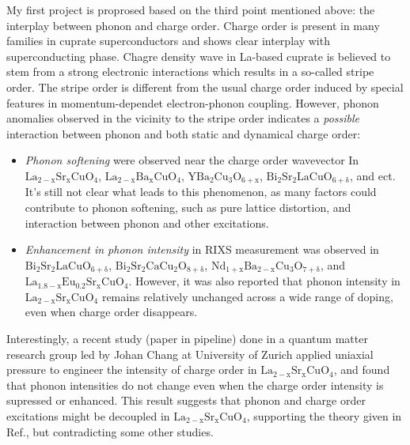 \documentclass[11pt]{article}
\begin{document}
My first project is proprosed based on the third point mentioned above: the interplay between phonon and charge order. Charge order is present in many families in cuprate superconductors and shows clear interplay with superconducting phase. Chagre density wave in La-based cuprate is believed to stem from a strong electronic interactions which results in a so-called stripe order\cite{harriger_stripe_nodate,tranquada_evidence_1995,choi_disentangling_2020}. The stripe order is different from the usual charge order induced by special features in momentum-dependet electron-phonon coupling. However, phonon anomalies observed in the vicinity to the stripe order indicates a \textit{possible} interaction between phonon and both static and dynamical charge order: 
\begin{itemize}
\item \textit{Phonon softening}  were observed near the charge order wavevector In $\mathrm{La_{2-x}Sr_{x}CuO_{4}}$\cite{lin_strongly_2020, wang_charge_2021, huang_quantum_2021}, $\mathrm{La_{2-x}Ba_{x}CuO_{4}}$\cite{miao_incommensurate_2018}, $\mathrm{YBa_{2}Cu_{3}O_{6+x}}$\cite{tacon_inelastic_2014}, $\mathrm{Bi_{2}Sr_{2}LaCuO_{6+\delta}}$\cite{li_multiorbital_2020}, and ect. It's still not clear what leads to this phenomenon, as many factors could contribute to phonon softening, such as pure lattice distortion\cite{lin_strongly_2020}, and interaction between phonon and other excitations.  
\item \textit{Enhancement in phonon intensity}  in RIXS measurement was observed in $\mathrm{Bi_{2}Sr_{2}LaCuO_{6+\delta}}$\cite{li_multiorbital_2020}, $\mathrm{Bi_{2}Sr_{2}CaCu_{2}O_{8+\delta}}$\cite{chaix_dispersive_2017}, $\mathrm{Nd_{1+x}Ba_{2-x}Cu_{3}O_{7+\delta}}$\cite{braicovich_determining_2020}, and $\mathrm{La_{1.8-x}Eu_{0.2}Sr_xCuO_{4}}$\cite{peng_enhanced_2020,wang_charge_2021,huang_quantum_2021}. However, it was also reported that phonon intensity in $\mathrm{La_{2-x}Sr_{x}CuO_{4}}$ remains relatively unchanged across a wide range of doping, even when charge order disappears\cite{lin_strongly_2020}.  
\end{itemize}

Interestingly, a recent study (paper in pipeline) done in a quantum matter research group led by Johan Chang at University of Zurich applied uniaxial pressure to engineer the intensity of charge order in $\mathrm{La_{2-x}Sr_{x}CuO_{4}}$, and found that phonon intensities do not change even when the charge order intensity is supressed or enhanced. This result suggests that phonon and charge order excitations might be decoupled in $\mathrm{La_{2-x}Sr_{x}CuO_{4}}$, supporting the theory given in Ref.\cite{lin_strongly_2020}, but contradicting some other studies\cite{li_multiorbital_2020, chaix_dispersive_2017,huang_quantum_2021}. 
\end{document}

